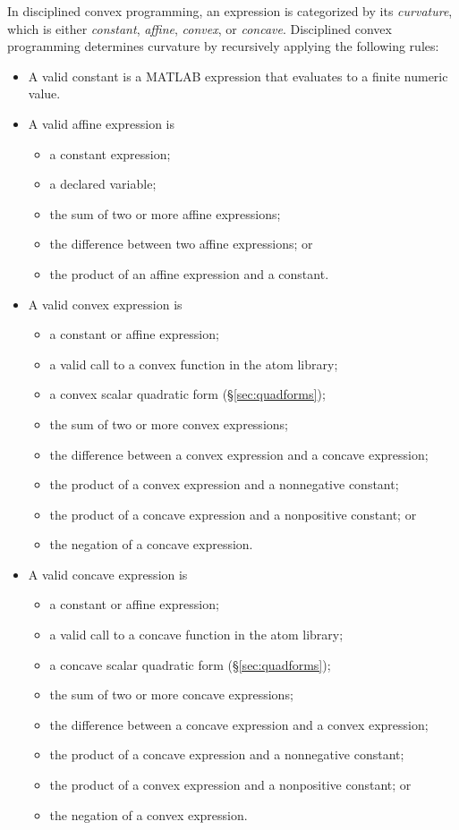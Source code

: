 \documentclass[12pt]{article}
\begin{document}
In disciplined convex programming, an expression is categorized by
its \emph{curvature}, which is either 
\emph{constant}, \emph{affine}, \emph{convex}, or \emph{concave}.
Disciplined convex programming determines curvature by recursively
applying the following rules:
\begin{itemize}
\item A valid constant is a MATLAB expression that evaluates
to a finite numeric value.
\item A valid affine expression is
\begin{itemize}
\item a constant expression;
\item a declared variable;
\item the sum of two or more affine expressions;
\item the difference between two affine expressions; or
\item the product of an affine expression and a constant.
\end{itemize}
\item A valid convex expression is
\begin{itemize}
\item a constant or affine expression;
\item a valid call to a convex function in the atom library;
\item a convex scalar quadratic form (\S\ref{sec:quadforms});
\item the sum of two or more convex expressions;
\item the difference between a convex expression and a concave expression;
\item the product of a convex expression and a nonnegative constant;
\item the product of a concave expression and a nonpositive constant; or
\item the negation of a concave expression.
\end{itemize}
\item A valid concave expression is
\begin{itemize}
\item a constant or affine expression;
\item a valid call to a concave function in the atom library;
\item a concave scalar quadratic form (\S\ref{sec:quadforms});
\item the sum of two or more concave expressions;
\item the difference between a concave expression and a convex expression;
\item the product of a concave expression and a nonnegative constant; 
\item the product of a convex expression and a nonpositive constant; or
\item the negation of a convex expression.
\end{itemize}
\end{itemize}
\end{document}
